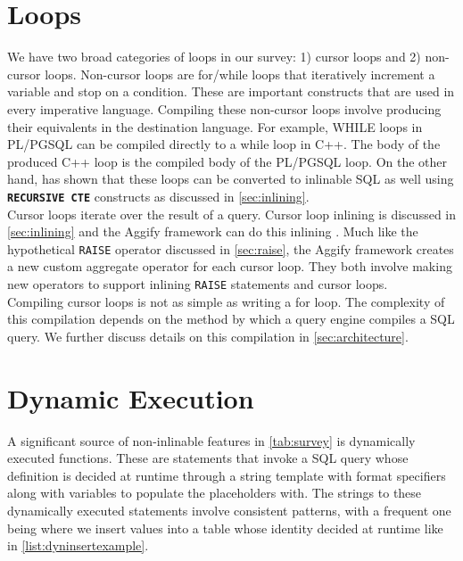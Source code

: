 \documentclass[12pt]{cmuthesis}
\newcommand{\dbSQL}[1]{\texttt{\textbf{#1}}\xspace}
\begin{document}
\section{Loops}
We have two broad categories of loops in our survey: 1) cursor loops and 2) non-cursor loops. Non-cursor loops are for/while loops that iteratively increment a variable and stop on a condition. These are important constructs that are used in every imperative language. Compiling these non-cursor loops involve producing their equivalents in the destination language. For example, WHILE loops in PL/PGSQL can be compiled directly to a while loop in C++. The body of the produced C++ loop is the compiled body of the PL/PGSQL loop. On the other hand, \citeauthor{duta19} has shown that these loops can be converted to inlinable SQL as well \cite{duta19} using \dbSQL{RECURSIVE CTE} constructs as discussed in \cref{sec:inlining}.\\

Cursor loops iterate over the result of a query. Cursor loop inlining is discussed in \cref{sec:inlining} and the Aggify framework can do this inlining \cite{gupta20}. Much like the hypothetical \texttt{RAISE} operator discussed in \cref{sec:raise}, the Aggify framework creates a new custom aggregate operator for each cursor loop. They both involve making new operators to support inlining \texttt{RAISE} statements and cursor loops.\\


Compiling cursor loops is not as simple as writing a for loop. The complexity of this compilation depends on the method by which a query engine compiles a SQL query. We further discuss details on this compilation in \cref{sec:architecture}.


\section{Dynamic Execution}

A significant source of non-inlinable features in \cref{tab:survey} is dynamically executed functions. These are statements that invoke a SQL query whose definition is decided at runtime through a string template with format specifiers along with variables to populate the placeholders with. The strings to these dynamically executed statements involve consistent patterns, with a frequent one being where we insert values into a table whose identity decided at runtime like in \cref{list:dyninsertexample}.\\
\end{document}
